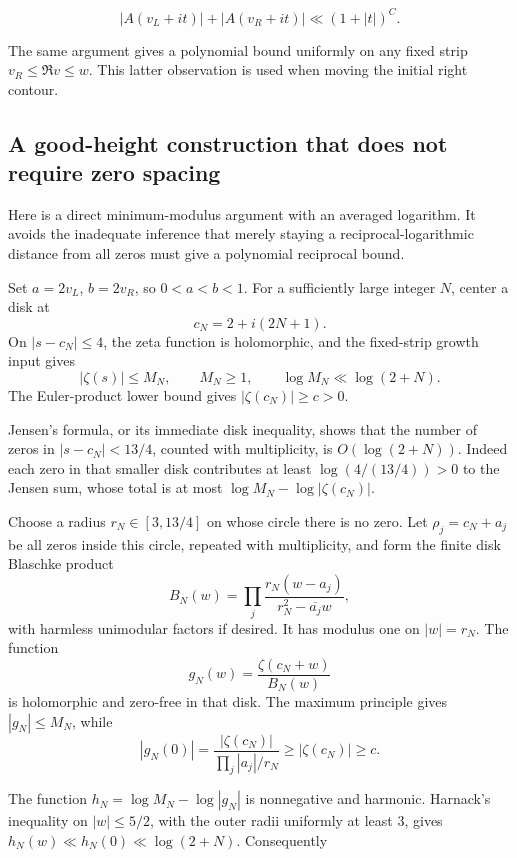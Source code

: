 \documentclass[11pt]{article}
\numberwithin{equation}{section}
\begin{document}
\begin{equation}\label{res:A2}
|A(v_L+it)|+|A(v_R+it)|
 \ll (1+|t|)^C.
\end{equation}

The same argument gives a polynomial bound uniformly on any fixed strip
\(v_R\leq\Re v\leq w\). This latter observation is used when moving the
initial right contour.

\subsection{A good-height construction that does not require zero
spacing}\label{a-good-height-construction-that-does-not-require-zero-spacing}

Here is a direct minimum-modulus argument with an averaged logarithm. It
avoids the inadequate inference that merely staying a
reciprocal-logarithmic distance from all zeros must give a polynomial
reciprocal bound.

Set \(a=2v_L\), \(b=2v_R\), so \(0<a<b<1\). For a sufficiently large
integer \(N\), center a disk at \[
 c_N=2+i(2N+1).
\] On \(|s-c_N|\leq4\), the zeta function is holomorphic, and the
fixed-strip growth input gives \[
 |\zeta(s)|\leq M_N,\qquad
 M_N\geq 1,\qquad \log M_N\ll\log(2+N).
\] The Euler-product lower bound gives \(|\zeta(c_N)|\geq c>0\).

Jensen's formula, or its immediate disk inequality, shows that the
number of zeros in \(|s-c_N|<13/4\), counted with multiplicity, is
\(O(\log(2+N))\). Indeed each zero in that smaller disk contributes at
least \(\log(4/(13/4))>0\) to the Jensen sum, whose total is at most
\(\log M_N-\log|\zeta(c_N)|\).

Choose a radius \(r_N\in[3,13/4]\) on whose circle there is no zero. Let
\(\rho_j=c_N+a_j\) be all zeros inside this circle, repeated with
multiplicity, and form the finite disk Blaschke product \[
 B_N(w)=\prod_j \frac{r_N(w-a_j)}{r_N^2-\overline{a_j}w},
\] with harmless unimodular factors if desired. It has modulus one on
\(|w|=r_N\). The function \[
 g_N(w)=\frac{\zeta(c_N+w)}{B_N(w)}
\] is holomorphic and zero-free in that disk. The maximum principle
gives \(|g_N|\leq M_N\), while \[
 |g_N(0)|=\frac{|\zeta(c_N)|}{\prod_j |a_j|/r_N}
 \geq|\zeta(c_N)|\geq c.
\]

The function \(h_N=\log M_N-\log|g_N|\) is nonnegative and harmonic.
Harnack's inequality on \(|w|\leq5/2\), with the outer radii uniformly
at least \(3\), gives \(h_N(w)\ll h_N(0)\ll\log(2+N)\). Consequently
\end{document}
